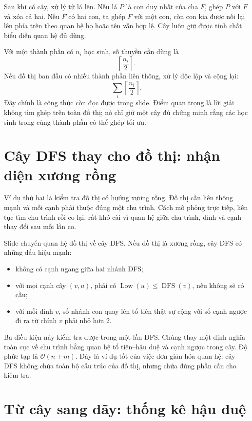 \documentclass[11pt]{article}
\newcommand{\Oh}{\mathcal{O}}
\begin{document}
Sau khi có cây, xử lý từ lá lên. Nếu lá \(P\) là con duy nhất của cha \(F\),
ghép \(P\) với \(F\) và xóa cả hai. Nếu \(F\) có hai con, ta ghép \(F\) với
một con, còn con kia được nối lại lên phía trên theo quan hệ họ hoặc tên vẫn
hợp lệ. Cây luôn giữ được tính chất biểu diễn quan hệ đủ dùng.

Với một thành phần có \(n_i\) học sinh, số thuyền cần dùng là
\[
  \left\lceil\frac{n_i}{2}\right\rceil.
\]
Nếu đồ thị ban đầu có nhiều thành phần liên thông, xử lý độc lập và cộng lại:
\[
  \sum_i \left\lceil\frac{n_i}{2}\right\rceil.
\]
Đây chính là công thức còn đọc được trong slide. Điểm quan trọng là lời giải
không tìm ghép trên toàn đồ thị; nó chỉ giữ một cây đủ chứng minh rằng các học
sinh trong cùng thành phần có thể ghép tối ưu.

\section{Cây DFS thay cho đồ thị: nhận diện xương rồng}

Ví dụ thứ hai là kiểm tra đồ thị có hướng xương rồng. Đồ thị cần liên thông
mạnh và mỗi cạnh phải thuộc đúng một chu trình. Cách mô phỏng trực tiếp,
liên tục tìm chu trình rồi co lại, rất khó cài vì quan hệ giữa chu trình, đỉnh
và cạnh thay đổi sau mỗi lần co.

Slide chuyển quan hệ đồ thị về cây DFS. Nếu đồ thị là xương rồng, cây DFS có
những dấu hiệu mạnh:
\begin{itemize}
  \item không có cạnh ngang giữa hai nhánh DFS;
  \item với mọi cạnh cây \((v,u)\), phải có \(\operatorname{Low}(u)\le
  \operatorname{DFS}(v)\), nếu không sẽ có cầu;
  \item với mỗi đỉnh \(v\), số nhánh con quay lên tổ tiên thật sự cộng với số
  cạnh ngược đi ra từ chính \(v\) phải nhỏ hơn \(2\).
\end{itemize}

Ba điều kiện này kiểm tra được trong một lần DFS. Chúng thay một định nghĩa
toàn cục về chu trình bằng quan hệ tổ tiên--hậu duệ và cạnh ngược trong cây.
Độ phức tạp là \(\Oh(n+m)\). Đây là ví dụ tốt của việc đơn giản hóa quan hệ:
cây DFS không chứa toàn bộ cấu trúc của đồ thị, nhưng chứa đúng phần cần cho
kiểm tra.

\section{Từ cây sang dãy: thống kê hậu duệ}
\end{document}
